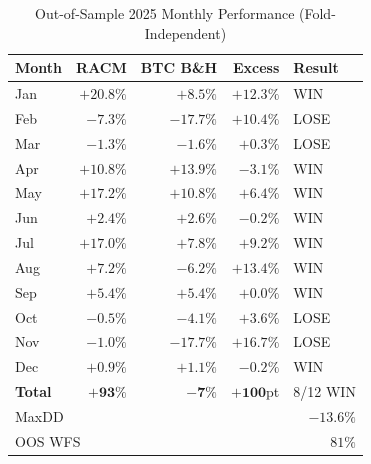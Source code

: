 \begin{table}[htbp]
\centering
\caption{Out-of-Sample 2025 Monthly Performance (Fold-Independent)}
\label{tab:oos}
\begin{tabular}{lrrrl}
\toprule
Month & RACM & BTC B\&H & Excess & Result \\
\midrule
Jan & $+20.8\%$ & $+8.5\%$   & $+12.3\%$ & WIN \\
Feb & $-7.3\%$  & $-17.7\%$  & $+10.4\%$ & LOSE \\
Mar & $-1.3\%$  & $-1.6\%$   & $+0.3\%$  & LOSE \\
Apr & $+10.8\%$ & $+13.9\%$  & $-3.1\%$  & WIN \\
May & $+17.2\%$ & $+10.8\%$  & $+6.4\%$  & WIN \\
Jun & $+2.4\%$  & $+2.6\%$   & $-0.2\%$  & WIN \\
Jul & $+17.0\%$ & $+7.8\%$   & $+9.2\%$  & WIN \\
Aug & $+7.2\%$  & $-6.2\%$   & $+13.4\%$ & WIN \\
Sep & $+5.4\%$  & $+5.4\%$   & $+0.0\%$  & WIN \\
Oct & $-0.5\%$  & $-4.1\%$   & $+3.6\%$  & LOSE \\
Nov & $-1.0\%$  & $-17.7\%$  & $+16.7\%$ & LOSE \\
Dec & $+0.9\%$  & $+1.1\%$   & $-0.2\%$  & WIN \\
\midrule
\textbf{Total} & $\mathbf{+93\%}$ & $\mathbf{-7\%}$ & $\mathbf{+100}$pt & 8/12 WIN \\
\midrule
\multicolumn{2}{l}{MaxDD} & \multicolumn{3}{r}{$-13.6\%$} \\
\multicolumn{2}{l}{OOS WFS} & \multicolumn{3}{r}{$81\%$} \\
\bottomrule
\end{tabular}
\end{table}

